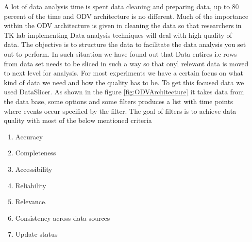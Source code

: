 \documentclass[article,type=msc,colorback,accentcolor=tud9c,twoside,11pt]{tudthesis}
\begin{document}
A lot of data analysis time is spent data cleaning and preparing data, up to 80 percent \cite{TinyData} of the time and  ODV architecture is no different. Much of the importance within the ODV architecture is given in cleaning the data so that researchers in TK lab implementing Data analysis techniques will deal with high quality of data. The objective is to structure the data to facilitate the data analysis you set out to perform. In such situation we have found out that Data entires i.e rows from data set needs to be sliced in such a way so that onyl relevant data is moved to next level for analysis. For most experiments we have a certain focus on what kind of data we need and how the quality has to be. To get this focused data we used DataSlicer. As shown in the figure \ref{fig:ODVArchitecture} it takes data from the data base, some options and some filters produces a list with time points where events occur specified by the filter. The goal of filters is to achieve data quality with most of the below mentioned criteria
\begin{enumerate}
	\item Accuracy
	\item Completeness
	\item Accessibility
	\item Reliability
	\item Relevance.
	\item Consistency across data sources
	\item Update status
\end{enumerate}
\end{document}
